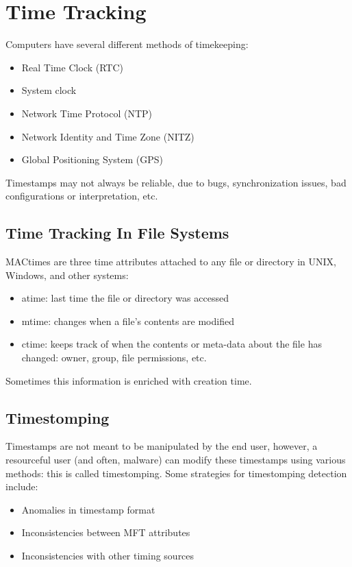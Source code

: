 \documentclass[10pt,a4paper]{report}
\begin{document}
\section{Time Tracking}
Computers have several different methods of timekeeping:
\begin{itemize}
\item Real Time Clock (RTC)
\item System clock
\item Network Time Protocol (NTP)
\item Network Identity and Time Zone (NITZ)
\item Global Positioning System (GPS)
\end{itemize}
Timestamps may not always be reliable, due to bugs, synchronization issues, bad configurations or interpretation, etc.
\subsection{Time Tracking In File Systems}
MACtimes are three time attributes attached to any file or directory in UNIX, Windows, and other systems:
\begin{itemize}
\item atime: last time the file or directory was accessed
\item mtime: changes when a file’s contents are modified
\item ctime: keeps track of when the contents or meta-data about the
file has changed: owner, group, file permissions, etc.
\end{itemize}
Sometimes this information is enriched with creation time.
\subsection{Timestomping}
Timestamps are not meant to be manipulated by the end user, however, a resourceful user (and often, malware) can modify these timestamps using various methods: this is called timestomping. Some strategies for timestomping detection include:
\begin{itemize}
\item Anomalies in timestamp format
\item Inconsistencies between MFT attributes
\item Inconsistencies with other timing sources
\end{itemize}
\end{document}
